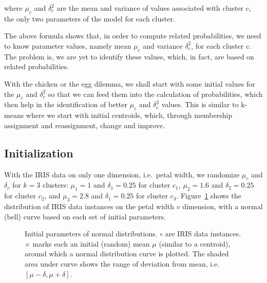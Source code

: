 \documentclass[
  letterpaper,
]{scrbook}
\begin{document}
where \(\mu_c\) and \(\delta_c^2\) are the mean and variance of values
associated with cluster \(c\), the only two parameters of the model for
each cluster.

The above formula shows that, in order to compute related probabilities,
we need to know parameter values, namely mean \(\mu_c\) and variance
\(\delta_c^2\), for each cluster \(c\). The problem is, we are yet to
identify these values, which, in fact, are based on related
probabilities.

With the chicken or the egg dilemma, we shall start with some initial
values for the \(\mu_c\) and \(\delta_c^2\) so that we can feed them
into the calculation of probabilities, which then help in the
identification of better \(\mu_c\) and \(\delta_c^2\) values. This is
similar to k-means where we start with initial centroids, which, through
membership assignment and reassignment, change and improve.

\subsection{Initialization}\label{initialization}

With the IRIS data on only one dimension, i.e.~petal width, we randomize
\(\mu_c\) and \(\delta_c\) for \(k=3\) clusters: \(\mu_1=1\) and
\(\delta_1=0.25\) for cluster \(c_1\), \(\mu_2=1.6\) and
\(\delta_2=0.25\) for cluster \(c_2\), and \(\mu_3=2.8\) and
\(\delta_1=0.25\) for cluster \(c_3\). Figure~\ref{fig-org-em1} shows
the distribution of IRIS data instances on the petal width \(v\)
dimension, with a normal (bell) curve based on each set of initial
parameters.

\begin{figure}


\caption{\label{fig-org-em1}Initial parameters of normal distributions.
\(\circ\) are IRIS data instances. \(\times\) marks each an initial
(random) mean \(\mu\) (similar to a centroid), around which a normal
distribution curve is plotted. The shaded area under curve shows the
range of deviation from mean, i.e.~\([\mu-\delta, \mu+\delta]\).}

\end{figure}%
\end{document}
